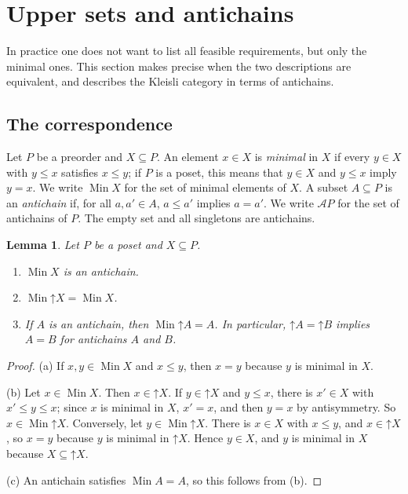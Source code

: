 \documentclass[11pt,a4paper]{article}
\theoremstyle{plain}
\newtheorem{lemma}[theorem]{Lemma}
\theoremstyle{definition}
\theoremstyle{remark}
\newcommand{\An}{\mathcal{A}}
\newcommand{\up}{\mathord{\uparrow}}
\DeclareMathOperator{\Min}{Min}
\begin{document}
\section{Upper sets and antichains}
\label{sec:antichains}

In practice one does not want to list all feasible requirements, but only the minimal ones.
This section makes precise when the two descriptions are equivalent, and describes the Kleisli category in terms of antichains.

\subsection{The correspondence}

Let $P$ be a preorder and $X \subseteq P$.
An element $x \in X$ is \emph{minimal} in $X$ if every $y \in X$ with $y \leq x$ satisfies $x \leq y$; if $P$ is a poset, this means that $y \in X$ and $y \leq x$ imply $y = x$.
We write $\Min X$ for the set of minimal elements of $X$.
A subset $A \subseteq P$ is an \emph{antichain} if, for all $a, a' \in A$, $a \leq a'$ implies $a = a'$.
We write $\An P$ for the set of antichains of $P$.
The empty set and all singletons are antichains.

\begin{lemma}
    \label{lem:min-up}
    Let $P$ be a poset and $X \subseteq P$.
    \begin{enumerate}[label=(\alph*)]
        \item $\Min X$ is an antichain.
        \item $\Min \up X = \Min X$.
        \item If $A$ is an antichain, then $\Min \up A = A$.
              In particular, $\up A = \up B$ implies $A = B$ for antichains $A$ and $B$.
    \end{enumerate}
\end{lemma}
\begin{proof}
    (a) If $x, y \in \Min X$ and $x \leq y$, then $x = y$ because $y$ is minimal in $X$.

    (b) Let $x \in \Min X$.
    Then $x \in \up X$.
    If $y \in \up X$ and $y \leq x$, there is $x' \in X$ with $x' \leq y \leq x$; since $x$ is minimal in $X$, $x' = x$, and then $y = x$ by antisymmetry.
    So $x \in \Min \up X$.
    Conversely, let $y \in \Min \up X$.
    There is $x \in X$ with $x \leq y$, and $x \in \up X$, so $x = y$ because $y$ is minimal in $\up X$.
    Hence $y \in X$, and $y$ is minimal in $X$ because $X \subseteq \up X$.

    (c) An antichain satisfies $\Min A = A$, so this follows from (b).
\end{proof}
\end{document}
